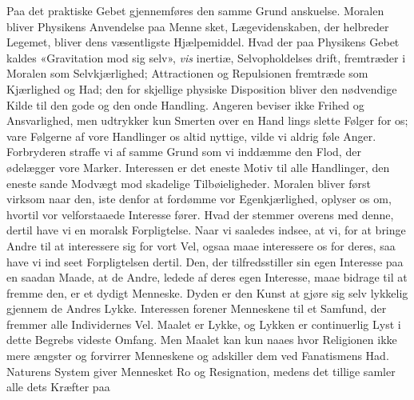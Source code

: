 \documentclass[12pt,a4paper]{book}
\begin{document}
Paa det praktiske Gebet gjennemføres den samme Grund\-%
anskuelse. Moralen bliver Physikens Anvendelse paa Menne\-%
sket, Lægevidenskaben, der helbreder Legemet, bliver dens
væsentligste Hjælpemiddel. Hvad der paa Physikens Gebet
kaldes «Gravitation mod sig selv», \emph{vis} inertiæ, Selvopholdelses\-%
drift, fremtræder i Moralen som Selvkjærlighed; Attractionen
og Repulsionen fremtræde som Kjærlighed og Had; den for\-%
skjellige physiske Disposition bliver den nødvendige Kilde til
den gode og den onde Handling. Angeren beviser ikke Frihed
og Ansvarlighed, men udtrykker kun Smerten over en Hand\-%
lings slette Følger for os; vare Følgerne af vore Handlinger
os altid nyttige, vilde vi aldrig føle Anger. Forbryderen
straffe vi af samme Grund som vi inddæmme den Flod, der
ødelægger vore Marker. Interessen er det eneste Motiv til
alle Handlinger, den eneste sande Modvægt mod skadelige
Tilbøieligheder. Moralen bliver først virksom naar den, iste\-%
denfor at fordømme vor Egenkjærlighed, oplyser os om, hvortil
vor velforstaaede Interesse fører. Hvad der stemmer overens
med denne, dertil have vi en moralsk Forpligtelse. Naar vi
saaledes indsee, at vi, for at bringe Andre til at interessere sig for
vort Vel, ogsaa maae interessere os for deres, saa have vi ind\-%
seet Forpligtelsen dertil. Den, der tilfredsstiller sin egen
Interesse paa en saadan Maade, at de Andre, ledede af deres
egen Interesse, maae bidrage til at fremme den, er et dydigt
Menneske. Dyden er den Kunst at gjøre sig selv lykkelig
gjennem de Andres Lykke. Interessen forener Menneskene til
et Samfund, der fremmer alle Individernes Vel. Maalet er
Lykke, og Lykken er continuerlig Lyst i dette Begrebs videste
Omfang. Men Maalet kan kun naaes hvor Religionen ikke
mere ængster og forvirrer Menneskene og adskiller dem ved
Fanatismens Had. Naturens System giver Mennesket Ro og
Resignation, medens det tillige samler alle dets Kræfter paa
\end{document}
